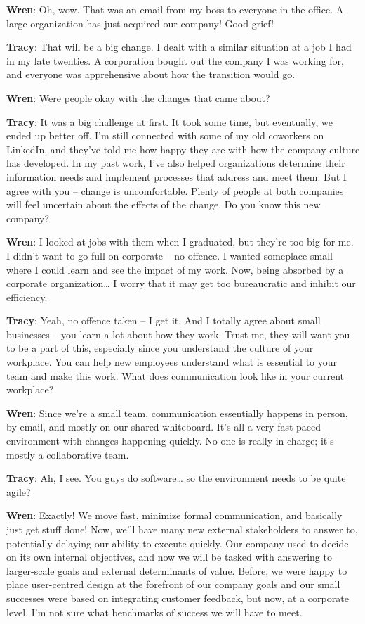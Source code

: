 \documentclass[
  letterpaper,
  DIV=11,
  numbers=noendperiod]{scrreprt}
\begin{document}
\textbf{Wren}: Oh, wow. That was an email from my boss to everyone in
the office. A large organization has just acquired our company! Good
grief!

\textbf{Tracy}: That will be a big change. I dealt with a similar
situation at a job I had in my late twenties. A corporation bought out
the company I was working for, and everyone was apprehensive about how
the transition would go.

\textbf{Wren}: Were people okay with the changes that came about?

\textbf{Tracy}: It was a big challenge at first. It took some time, but
eventually, we ended up better off. I'm still connected with some of my
old coworkers on LinkedIn, and they've told me how happy they are with
how the company culture has developed. In my past work, I've also helped
organizations determine their information needs and implement processes
that address and meet them. But I agree with you -- change is
uncomfortable. Plenty of people at both companies will feel uncertain
about the effects of the change. Do you know this new company?

\textbf{Wren}: I looked at jobs with them when I graduated, but they're
too big for me. I didn't want to go full on corporate -- no offence. I
wanted someplace small where I could learn and see the impact of my
work. Now, being absorbed by a corporate organization\ldots{} I worry
that it may get too bureaucratic and inhibit our efficiency.

\textbf{Tracy}: Yeah, no offence taken -- I get it. And I totally agree
about small businesses -- you learn a lot about how they work. Trust me,
they will want you to be a part of this, especially since you understand
the culture of your workplace. You can help new employees understand
what is essential to your team and make this work. What does
communication look like in your current workplace?

\textbf{Wren}: Since we're a small team, communication essentially
happens in person, by email, and mostly on our shared whiteboard. It's
all a very fast-paced environment with changes happening quickly. No one
is really in charge; it's mostly a collaborative team.

\textbf{Tracy}: Ah, I see. You guys do software\ldots{} so the
environment needs to be quite agile?

\textbf{Wren}: Exactly! We move fast, minimize formal communication, and
basically just get stuff done! Now, we'll have many new external
stakeholders to answer to, potentially delaying our ability to execute
quickly. Our company used to decide on its own internal objectives, and
now we will be tasked with answering to larger-scale goals and external
determinants of value. Before, we were happy to place user-centred
design at the forefront of our company goals and our small successes
were based on integrating customer feedback, but now, at a corporate
level, I'm not sure what benchmarks of success we will have to meet.
\end{document}
